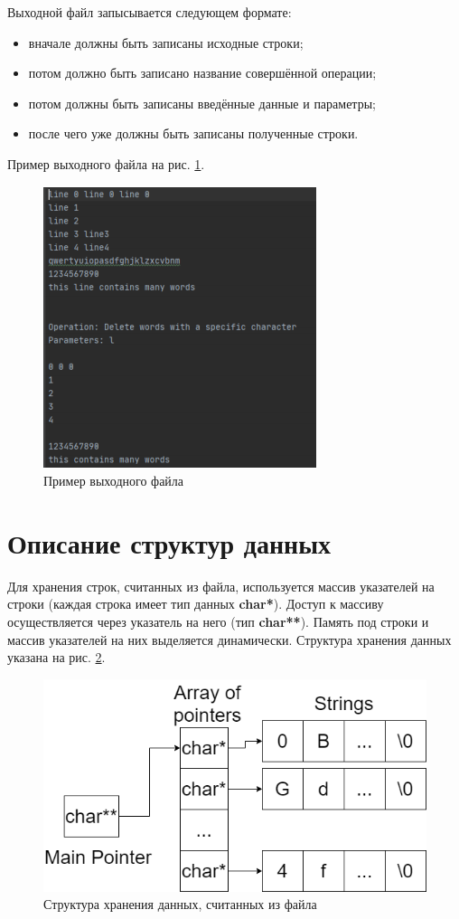 \documentclass[12pt,a4paper]{article}  %
\begin{document}
	Выходной файл запысывается следующем формате:
	\begin{itemize}
		\item вначале должны быть записаны исходные строки;
		\item потом должно быть записано название совершённой операции;
		\item потом должны быть записаны введённые данные и параметры;
		\item после чего уже должны быть записаны полученные строки.
	\end{itemize}

	Пример выходного файла на рис. \ref{ofe}.
	
	\begin{figure}[H]
		\centering
		\includegraphics[width=0.6\linewidth]{photo/test.1.file}
		\caption{Пример выходного файла}
		\label{ofe}
	\end{figure}
	
	\section*{Описание структур данных}
	
	Для хранения строк, считанных из файла, используется массив указателей на строки (каждая строка имеет тип данных \textbf{char*}). Доступ к массиву осуществляется через указатель на него (тип \textbf{char**}). Память под строки и массив указателей на них выделяется динамически. Структура хранения данных указана на рис. \ref{data_schema}.
	
	\begin{figure}[H]
		\centering
	 	\includegraphics[width=0.6\linewidth]{photo/data_schema}
	 	\caption{Структура хранения данных, считанных из файла}
	 	\label{data_schema}
	\end{figure}
	
\end{document}

